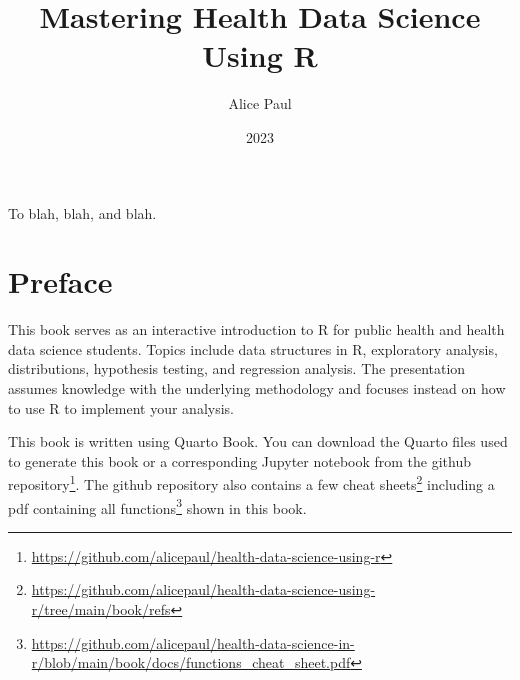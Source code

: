 \documentclass[
  letterpaper,
]{krantz}
\title{Mastering Health Data Science Using R}
\author{Alice Paul}
\date{2023}
\renewcommand{\href}[2]{#2\footnote{\url{#1}}}
\renewcommand*\contentsname{Table of contents}
\newcommand\contentsname{Table of contents}
\begin{document}
\maketitle

\thispagestyle{empty}

\begin{center}
To blah, blah, and blah.
\end{center}

\setlength{\abovedisplayskip}{-5pt}
\setlength{\abovedisplayshortskip}{-5pt}

\ifdefined\Shaded\renewenvironment{Shaded}{\begin{tcolorbox}[sharp corners, frame hidden, boxrule=0pt, breakable, borderline west={3pt}{0pt}{shadecolor}, interior hidden, enhanced]}{\end{tcolorbox}}\fi

\renewcommand*\contentsname{Table of contents}
{
\hypersetup{linkcolor=}
\setcounter{tocdepth}{2}
\tableofcontents
}

\hypertarget{preface}{%
\chapter*{Preface}\label{preface}}


This book serves as an interactive introduction to R for public health
and health data science students. Topics include data structures in R,
exploratory analysis, distributions, hypothesis testing, and regression
analysis. The presentation assumes knowledge with the underlying
methodology and focuses instead on how to use R to implement your
analysis.

This book is written using Quarto Book. You can download the Quarto
files used to generate this book or a corresponding Jupyter notebook
from the
\href{https://github.com/alicepaul/health-data-science-using-r}{github
repository}. The github repository also contains a few
\href{https://github.com/alicepaul/health-data-science-using-r/tree/main/book/refs}{cheat
sheets} including a pdf containing
\href{https://github.com/alicepaul/health-data-science-in-r/blob/main/book/docs/functions_cheat_sheet.pdf}{all
functions} shown in this book.
\end{document}
